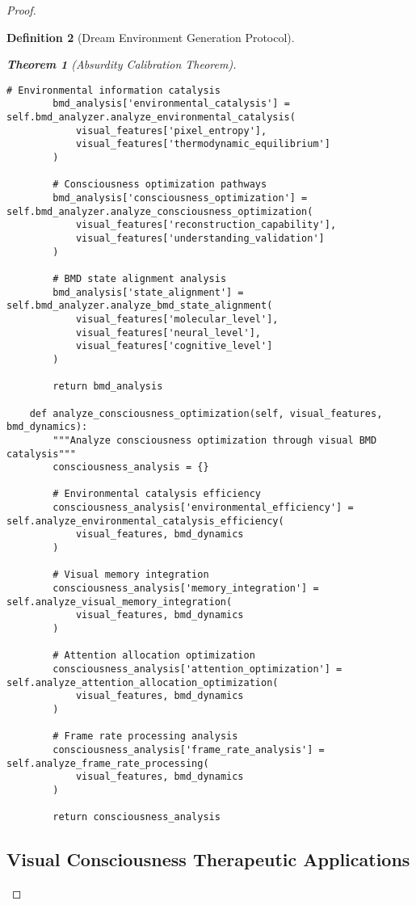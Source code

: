 \documentclass[12pt,a4paper]{article}
\newtheorem{theorem}{Theorem}[section]
\newtheorem{definition}[theorem]{Definition}
\begin{document}
\begin{proof}
\begin{definition}[Dream Environment Generation Protocol]
\begin{theorem}[Absurdity Calibration Theorem]
\begin{lstlisting}[style=pythonstyle, caption=Complete Visual Consciousness Analysis]
        # Environmental information catalysis
        bmd_analysis['environmental_catalysis'] = self.bmd_analyzer.analyze_environmental_catalysis(
            visual_features['pixel_entropy'],
            visual_features['thermodynamic_equilibrium']
        )
        
        # Consciousness optimization pathways
        bmd_analysis['consciousness_optimization'] = self.bmd_analyzer.analyze_consciousness_optimization(
            visual_features['reconstruction_capability'],
            visual_features['understanding_validation']
        )
        
        # BMD state alignment analysis
        bmd_analysis['state_alignment'] = self.bmd_analyzer.analyze_bmd_state_alignment(
            visual_features['molecular_level'],
            visual_features['neural_level'],
            visual_features['cognitive_level']
        )
        
        return bmd_analysis
    
    def analyze_consciousness_optimization(self, visual_features, bmd_dynamics):
        """Analyze consciousness optimization through visual BMD catalysis"""
        consciousness_analysis = {}
        
        # Environmental catalysis efficiency
        consciousness_analysis['environmental_efficiency'] = self.analyze_environmental_catalysis_efficiency(
            visual_features, bmd_dynamics
        )
        
        # Visual memory integration
        consciousness_analysis['memory_integration'] = self.analyze_visual_memory_integration(
            visual_features, bmd_dynamics
        )
        
        # Attention allocation optimization
        consciousness_analysis['attention_optimization'] = self.analyze_attention_allocation_optimization(
            visual_features, bmd_dynamics
        )
        
        # Frame rate processing analysis
        consciousness_analysis['frame_rate_analysis'] = self.analyze_frame_rate_processing(
            visual_features, bmd_dynamics
        )
        
        return consciousness_analysis
\end{lstlisting}

\subsection{Visual Consciousness Therapeutic Applications}


\end{theorem}
\end{definition}
\end{proof}
\end{document}
